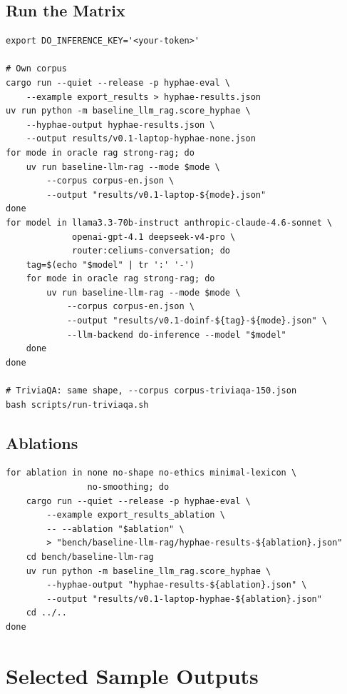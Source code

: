 \subsection{Run the Matrix}

\begin{lstlisting}[caption={Run \textsc{Hyphae}, local Llama-8B,
and the DO Inference 5-model matrix on both corpora.},
                    label={lst:run-matrix}]
export DO_INFERENCE_KEY='<your-token>'

# Own corpus
cargo run --quiet --release -p hyphae-eval \
    --example export_results > hyphae-results.json
uv run python -m baseline_llm_rag.score_hyphae \
    --hyphae-output hyphae-results.json \
    --output results/v0.1-laptop-hyphae-none.json
for mode in oracle rag strong-rag; do
    uv run baseline-llm-rag --mode $mode \
        --corpus corpus-en.json \
        --output "results/v0.1-laptop-${mode}.json"
done
for model in llama3.3-70b-instruct anthropic-claude-4.6-sonnet \
             openai-gpt-4.1 deepseek-v4-pro \
             router:celiums-conversation; do
    tag=$(echo "$model" | tr ':' '-')
    for mode in oracle rag strong-rag; do
        uv run baseline-llm-rag --mode $mode \
            --corpus corpus-en.json \
            --output "results/v0.1-doinf-${tag}-${mode}.json" \
            --llm-backend do-inference --model "$model"
    done
done

# TriviaQA: same shape, --corpus corpus-triviaqa-150.json
bash scripts/run-triviaqa.sh
\end{lstlisting}

\subsection{Ablations}

\begin{lstlisting}[caption={Run the four ablation conditions.},
                    label={lst:ablations}]
for ablation in none no-shape no-ethics minimal-lexicon \
                no-smoothing; do
    cargo run --quiet --release -p hyphae-eval \
        --example export_results_ablation \
        -- --ablation "$ablation" \
        > "bench/baseline-llm-rag/hyphae-results-${ablation}.json"
    cd bench/baseline-llm-rag
    uv run python -m baseline_llm_rag.score_hyphae \
        --hyphae-output "hyphae-results-${ablation}.json" \
        --output "results/v0.1-laptop-hyphae-${ablation}.json"
    cd ../..
done
\end{lstlisting}

\section{Selected Sample Outputs}
\label{app:samples}

